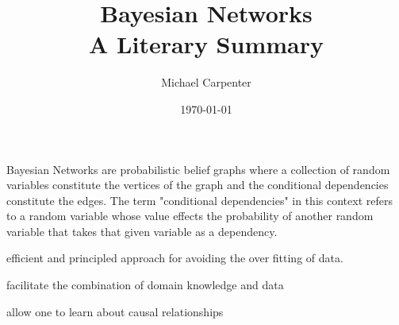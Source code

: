 \documentclass{article}
\title{Bayesian Networks \\ A Literary Summary}
\author{Michael Carpenter}
\date{\today}
\begin{document}
\maketitle

Bayesian Networks are probabilistic belief graphs where a collection of random variables constitute the vertices of the graph and the conditional dependencies constitute the edges. The term "conditional dependencies" in this context refers to a random variable whose value effects the probability of another random variable that takes that given variable as a dependency. 

efficient and principled approach for avoiding the over fitting of data.

facilitate the combination of domain knowledge and data

allow one to learn about causal relationships
\end{document}
